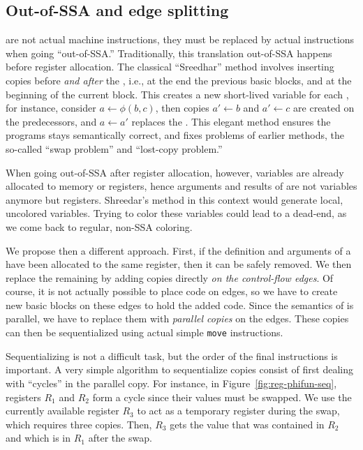 {\subsection{Out-of-SSA and edge splitting}


\phifuns are not actual machine instructions, they must be replaced by actual instructions when going ``out-of-SSA.''
Traditionally, this translation out-of-SSA happens before register allocation.
The classical ``Sreedhar'' method involves inserting copies before \emph{and after} the \phifuns, i.e., at the end the previous basic blocks, and at the beginning of the current block.
This creates a new short-lived variable for each \phifun, for instance, consider $a \gets \phi(b,c)$, then copies $a' \gets b$ and $a' \gets c$ are created on the predecessors, and $a \gets a'$ replaces the \phifun. 
This elegant method ensures the programs stays semantically correct, and fixes problems of earlier methods, the so-called ``swap problem'' and ``lost-copy problem.''

When going out-of-SSA after register allocation, however, variables are already allocated to memory or registers, hence arguments and results of \phifuns are not variables anymore but registers.
Shreedar's method in this context would generate local, uncolored variables.
Trying to color these variables could lead to a dead-end, as we come back to regular, non-SSA coloring.

\smallskip
We propose then a different approach. First, if the definition and arguments of a \phifun have been allocated to the same register, then it can be safely removed.
We then replace the remaining \phifuns by adding copies directly \emph{on the control-flow edges}.
Of course, it is not actually possible to place code on edges, so we have to create new basic blocks on these edges to hold the added code.
Since the semantics of \phifuns is parallel, we have to replace them with \emph{parallel copies} on the edges.
These copies can then be sequentialized using actual simple {\tt move} instructions.

Sequentializing is not a difficult task, but the order of the final instructions is important.
A very simple algorithm to sequentialize copies consist of first dealing with ``cycles'' in the parallel copy.
For instance, in Figure~\ref{fig:reg-phifun-seq}, registers $R_1$ and $R_2$ form a cycle since their values must be swapped.
We use the currently available register $R_3$ to act as a temporary register during the swap, which requires three copies.
Then, $R_3$ gets the value that was contained in $R_2$ and which is in $R_1$ after the swap.


}
